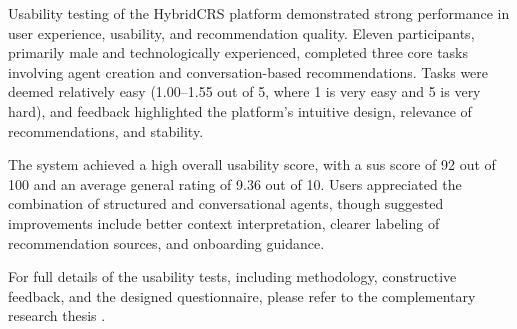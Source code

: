 Usability testing of the HybridCRS platform demonstrated strong performance in user experience, usability, and recommendation quality. Eleven participants, primarily male and technologically experienced, completed three core tasks involving agent creation and conversation-based recommendations. Tasks were deemed relatively easy (1.00–1.55 out of 5, where 1 is very easy and 5 is very hard), and feedback highlighted the platform's intuitive design, relevance of recommendations, and stability.

The system achieved a high overall usability score, with a \ac{sus} \cite{SUS} score of 92 out of 100 and an average general rating of 9.36 out of 10. Users appreciated the combination of structured and conversational agents, though suggested improvements include better context interpretation, clearer labeling of recommendation sources, and onboarding guidance.

For full details of the usability tests, including methodology, constructive feedback, and the designed questionnaire, please refer to the complementary research thesis \cite{MUI2ICSI_THESIS}.